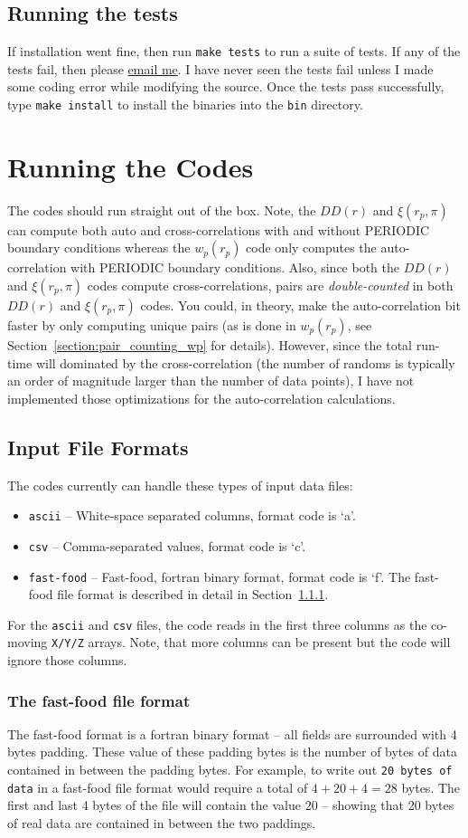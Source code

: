\documentclass[12pt,titlepage]{article}
\let\stdsection\section
\newcommand{\xir}{\ensuremath{{DD(r)}}\xspace}
\newcommand{\wprp}{\ensuremath{{w_p(r_p)}}\xspace}
\newcommand{\xirppi}{\ensuremath{{\xi(r_p,\pi)}}\xspace}
\begin{document}
\subsection{Running the tests}
If installation went fine, then run \texttt{make tests} to run a suite of tests. If any of the tests fail, then please \href{mailto:manodeep@gmail.com}{email me}. I have 
never seen the tests fail unless I made some coding error while modifying the source. 
Once the tests pass successfully, type \texttt{make install} to install the binaries into the \texttt{bin} directory. 

\stdsection{Running the Codes}
The codes should run straight out of the box. Note, the \xir and \xirppi can compute both auto and cross-correlations with and without PERIODIC boundary conditions whereas the \wprp code 
only computes the auto-correlation with PERIODIC boundary conditions. Also, since both the \xir and \xirppi codes compute cross-correlations, pairs are {\em double-counted} in both 
\xir and \xirppi codes. You could, in theory, make the auto-correlation bit faster by only computing unique pairs (as is done in \wprp, see Section~\ref{section:pair_counting_wp} 
for details). However, since the total run-time will dominated by the cross-correlation (the number of randoms is typically an order of magnitude larger than the number 
of data points), I have not implemented those optimizations for the auto-correlation calculations. 
\subsection{Input File Formats}\label{section:formats}
The codes currently can handle these types of input data files:
\begin{itemize}
\item \texttt{ascii} -- White-space separated columns, format code is `a'.
\item \texttt{csv}   -- Comma-separated values, format code is `c'.
\item \texttt{fast-food} -- Fast-food, fortran binary format, format code is `f'.
The fast-food file format is described in detail in Section~\ref{section:fastfood}.
\end{itemize}
For the \texttt{ascii} and \texttt{csv} files, the code reads in the first three columns as the co-moving \texttt{X/Y/Z} arrays. Note, that more columns 
can be present but the code will ignore those columns. 

\subsubsection{The fast-food file format}\label{section:fastfood}
The fast-food format is a fortran binary format -- all fields are surrounded with 4 bytes padding. These value of these padding bytes 
is the number of bytes of data contained in between the padding bytes. For example, to write out \texttt{20 bytes of data} in 
a fast-food file format would require a total of $4+20+4=28$ bytes. The first and last 4 bytes of the file will contain the value $20$ -- 
showing that 20 bytes of real data are contained in between the two paddings. 
\end{document}
